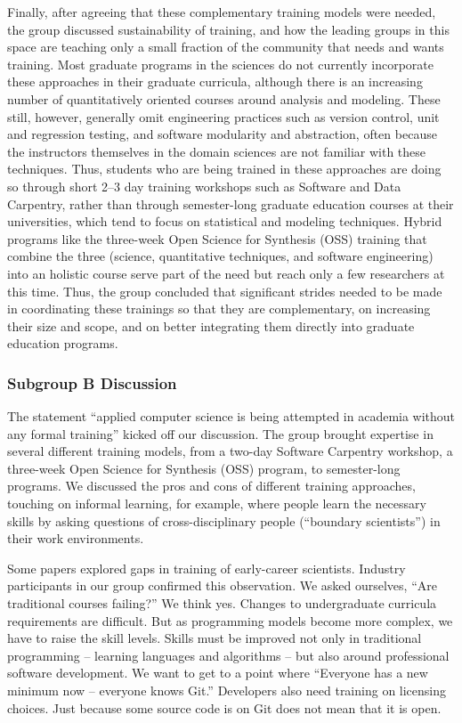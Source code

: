 \documentclass[11pt, oneside]{amsart}
\begin{document}
Finally, after agreeing that these complementary training models were needed,
the group discussed sustainability of training, and how the leading groups in
this space are teaching only a small fraction of the community that needs and
wants training. Most graduate programs in the sciences do not currently
incorporate these approaches in their graduate curricula, although there is an
increasing number of quantitatively oriented courses around analysis and
modeling. These still, however, generally omit engineering practices such as
version control, unit and regression testing, and software modularity and
abstraction, often because the instructors themselves in the domain sciences are
not familiar with these techniques. Thus, students who are being trained in
these approaches are doing so through short 2--3 day training workshops such as
Software and Data Carpentry, rather than through semester-long graduate
education courses at their universities, which tend to focus on statistical and
modeling techniques. Hybrid programs like the three-week Open Science for
Synthesis (OSS) training that combine the three (science, quantitative
techniques, and software engineering) into an holistic course serve part of the
need but reach only a few researchers at this time. Thus, the group concluded
that significant strides needed to be made in coordinating these trainings so
that they are complementary, on increasing their size and scope, and on better
integrating them directly into graduate education programs.


\subsubsection{Subgroup B Discussion}
The statement ``applied computer science is being attempted in academia without
any formal training'' kicked off our discussion. The group brought expertise in
several different training models, from a two-day Software Carpentry workshop,
a three-week Open Science for Synthesis (OSS) program, to semester-long
programs. We discussed the pros and cons of different training approaches,
touching on informal learning, for example, where people learn the necessary
skills by asking questions of cross-disciplinary people (``boundary scientists'') in
their work environments.

Some papers explored gaps in training of early-career scientists. Industry
participants in our group confirmed this observation. We asked ourselves, ``Are traditional
courses failing?'' We think yes. Changes to undergraduate curricula requirements
are difficult. But as programming models become more complex, we have to raise
the skill levels. Skills must be improved not only in traditional programming --
learning languages and algorithms -- but also around professional software
development. We want to get to a point where ``Everyone has a new minimum now --
everyone knows Git.'' Developers also need training on licensing choices. Just
because some source code is on Git does not mean that it is open.
\end{document}
